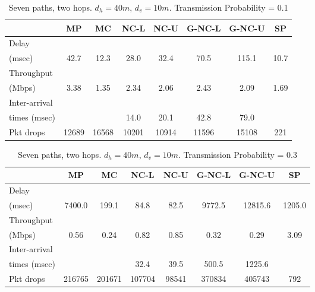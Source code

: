 \documentclass[journal, onecolumn, 12pt]{IEEEtran}
\begin{document}
\begin{table}[hb]
\begin{center}
\scriptsize
\begin{tabular}{|l|c|c|c|c|c|c|c|}
\hline
~                                   & MP & MC & NC-L & NC-U & G-NC-L & G-NC-U & SP \\ \hline
Delay           &   &   &  &  & & & \\
(msec)           & 42.7  & 12.3  & 28.0 & 32.4 & 70.5 & 115.1 & 10.7\\ \hline
Throughput             & ~  & ~  & ~    & ~    & ~           & ~           & ~  \\
(Mbps)                 & 3.38  & 1.35 & 2.34 & 2.06 & 2.43 & 2.09 & 1.69  \\ \hline
Inter-arrival             & ~  & ~  & ~    & ~    & ~           & ~           & ~  \\
times (msec)   &   &   &  14.0 & 20.1 & 42.8 &  79.0 &   \\ \hline
Pkt drops          & 12689  & 16568  & 10201 & 10914 & 11596 & 15108 & 221 \\ \hline
\end{tabular}
\end{center}
\caption {Seven paths, two hops. $d_{h}=40m$, $d_{v}=10m$. Transmission Probability = 0.1}
\label{tab:sim_topol_3_0.1}
\end{table}

\begin{table}[hb]
\begin{center}
\scriptsize
\begin{tabular}{|l|c|c|c|c|c|c|c|}
\hline
~                                   & MP & MC & NC-L & NC-U & G-NC-L & G-NC-U & SP \\ \hline
Delay           &   &   &  &  & & & \\
(msec)           & 7400.0  & 199.1  & 84.8 & 82.5 & 9772.5 & 12815.6 & 1205.0\\ \hline
Throughput             & ~  & ~  & ~    & ~    & ~           & ~           & ~  \\
(Mbps)                 & 0.56  & 0.24 &  0.82   & 0.85  & 0.32  & 0.29 & 3.09  \\ \hline
Inter-arrival             & ~  & ~  & ~    & ~    & ~           & ~           & ~  \\
times (msec)   &   &   &  32.4 & 39.5 &  500.5 &  1225.6 &   \\ \hline
Pkt drops          & 216765  & 201671  & 107704 & 98541 & 370834 & 405743 & 792 \\ \hline

\end{tabular}
\end{center}
\caption {Seven paths, two hops. $d_{h}=40m$, $d_{v}=10m$. Transmission Probability = 0.3}
\label{tab:sim_topol_3_0.3}
\end{table}
\end{document}
